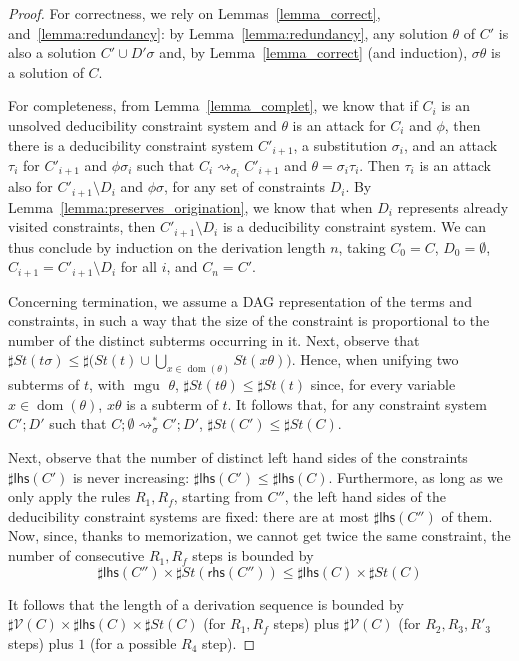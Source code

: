 \documentclass[acmtocl,acmnow]{acmtrans2m}
\newcommand{\card}[1]{\sharp{#1}}
\newcommand{\var}{\mathcal{V}}
\newcommand{\dom}{\operatorname{dom}}
\newcommand{\mgu}{\operatorname{mgu}}
\newcommand{\st}{\mathit{St}}
\newcommand{\lhs}{\mathsf{lhs}}
\newcommand{\rhs}{\mathsf{rhs}}
\newcommand{\simpl}{\rightsquigarrow}   \newcommand{\msimpl}{\rightsquigarrow}  \newcommand{\gsimpl}{\leadsto}
\newcommand{\dedsys}[1]{deducibility constraint system}
\newcommand{\dedsyss}[1]{deducibility constraint systems}
\begin{document}
\begin{proof}
For correctness, we rely on Lemmas~\ref{lemma_correct},
and~\ref{lemma:redundancy}: by Lemma~\ref{lemma:redundancy}, any solution  $\theta$ of $C'$ 
is also a solution $C' \cup D'\sigma$ and, by Lemma~\ref{lemma_correct} (and induction),
$\sigma\theta$ is a solution of $C$. 

For completeness, 
from Lemma~\ref{lemma_complet}, we know that
if $C_i$ is an unsolved \dedsys{} and $\theta$ is an attack
for $C_i$ and $\phi$, then there is a \dedsys{} $C'_{i+1}$, a substitution $\sigma_i$,
and an attack $\tau_i$ for $C'_{i+1}$ and $\phi\sigma_i$ such that $C_{i}\simpl_{\sigma_{i}} C'_{i+1}$ and $\theta=\sigma_i\tau_i$.
Then $\tau_i$ is an attack also for $C'_{i+1}\setminus D_i$ and
$\phi\sigma$, for any set of constraints $D_i$. By
Lemma~\ref{lemma:preserves_origination}, we know that when $D_i$
represents already visited constraints, then $C'_{i+1}\setminus D_i$
is a \dedsys{}. We can thus conclude by induction on the derivation
length $n$, taking $C_0=C$, $D_0=\emptyset$, $C_{i+1}=C'_{i+1}\setminus
D_i$ for all $i$, and $C_n=C'$.





Concerning termination, we assume a DAG representation of
the terms and constraints, in such a way that the size of the constraint
is proportional to the number of the distinct subterms occurring in it.
Next, observe that $\card\st(t\sigma) \leq \card(\st(t)\cup \bigcup_{x\in\dom(\theta)} \st(x\theta))$. Hence, when unifying two subterms of $t$, with
$\mgu$ $\theta$,
$\card\st(t\theta) \leq \card\st(t)$ since, for every variable $x\in \dom(\theta)$, $x\theta$ is a subterm of $t$. It follows that, for any constraint system
$C';D'$ such that $C;\emptyset \msimpl_\sigma^* C';D'$, $\card\st(C') \leq \card\st(C)$. 

Next, observe that the number of distinct left hand sides of the constraints
$\card\lhs(C')$ is never increasing: $\card\lhs(C') \leq \card\lhs(C)$.
Furthermore, as long as we only apply the rules $R_1,R_f$, starting from $C''$,
 the 
left hand sides of the \dedsyss{} are fixed: there are at most
$\card\lhs(C'')$ of them. 
Now, since, thanks to memorization, we cannot get twice the same
constraint, the number of consecutive $R_1,R_f$ steps is bounded by
\[\card\lhs(C'') \times \card\st(\rhs(C'')) \leq \card\lhs(C) \times 
\card\st(C) \]

It follows that the length of a derivation sequence is bounded
by  $\card\var(C)\times \card\lhs(C) \times \card\st(C)$ (for $R_1,R_f$ steps)
plus $\card\var(C)$ (for $R_2,R_3,R'_3$ steps) plus $1$ (for a possible
$R_4$ step).
\end{proof}
\end{document}
